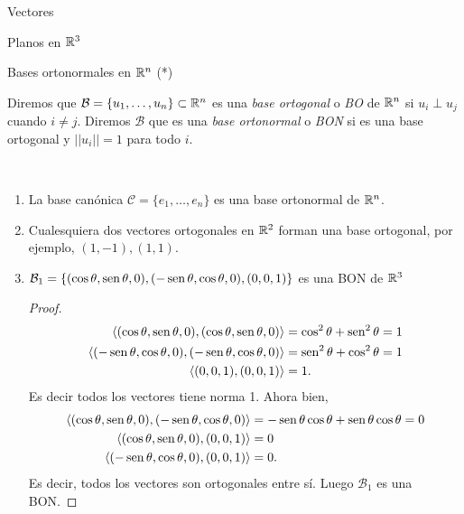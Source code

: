 \begin{chapter}{Vectores}
\begin{section}{Planos en $\mathbb R^3$}
   \end{section}

   \begin{section}{Bases ortonormales en $\mathbb R^n$ (*)}\label{seccion-bases-ortonormales-rn}


    \begin{definicion} \label{def-bo}\label{def-bon}
        Diremos que $\mathcal B =\{u_1,\ldots,u_n\}\subset \mathbb R^n$ es una \textit{base ortogonal} o \textit{BO} de $\mathbb R^n$ si $u_i \perp u_j$ cuando $i\ne j$. Diremos $\mathcal B$ que es una \textit{base ortonormal} o \textit{BON} si es una base ortogonal y $||u_i||=1$ para todo $i$.    
    \end{definicion}

    \begin{ejemplo*} 

        \

        \begin{enumerate}
            \item La base canónica $\mathcal C= \{e_1,\ldots,e_n\}$  es una base ortonormal de $\mathbb R^n$. 
            \item Cualesquiera dos vectores ortogonales en $\mathbb R^2$ forman una base ortogonal, por ejemplo, $(1,-1), (1,1)$.
            \item $\mathcal B_1 = \{(\cos\theta, \operatorname{sen}\theta,0),  (-\operatorname{sen}\theta, \cos\theta,0 ),  (0,0,1)\}$ es una BON  de $\mathbb R^3$
            \begin{proof}
                \begin{align*}
                    \langle (\cos\theta, \operatorname{sen}\theta,0), (\cos\theta, \operatorname{sen}\theta,0)\rangle &= \cos^2\theta+ \operatorname{sen}^2\theta = 1\\
                    \langle (-\operatorname{sen}\theta, \cos\theta,0 ),  (-\operatorname{sen}\theta, \cos\theta,0 )\rangle &= \operatorname{sen}^2\theta +\cos^2\theta = 1\\
                    \langle (0,0,1),  (0,0,1)\rangle &=1.
                \end{align*}
                Es decir todos los vectores tiene norma 1. Ahora bien,
                \begin{align*}
                    \langle (\cos\theta, \operatorname{sen}\theta,0),  (-\operatorname{sen}\theta, \cos\theta,0 )\rangle &= -\operatorname{sen}\theta\cos\theta+ \operatorname{sen}\theta\cos\theta = 0\\
                    \langle (\cos\theta, \operatorname{sen}\theta,0),  (0,0,1 )\rangle &=0\\
                    \langle  (-\operatorname{sen}\theta, \cos\theta,0 ),  (0,0,1 )\rangle &=0.
                \end{align*}
                Es decir,  todos los vectores son ortogonales entre sí. Luego $\mathcal B_1$  es una BON.
                

\end{proof}
\end{enumerate}
\end{ejemplo*}
\end{section}
\end{chapter}
